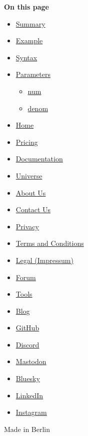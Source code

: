 \textbf{On this page}

\begin{itemize}
\tightlist
\item
  \hyperref[summary]{Summary}
\item
  \hyperref[example]{Example}
\item
  \hyperref[syntax]{Syntax}
\item
  \hyperref[parameters]{Parameters}

  \begin{itemize}
  \tightlist
  \item
    \hyperref[parameters-num]{num}
  \item
    \hyperref[parameters-denom]{denom}
  \end{itemize}
\end{itemize}

\begin{itemize}
\tightlist
\item
  \href{/}{Home}
\item
  \href{/pricing/}{Pricing}
\item
  \href{/docs/}{Documentation}
\item
  \href{/universe/}{Universe}
\item
  \href{/about/}{About Us}
\item
  \href{/contact/}{Contact Us}
\item
  \href{/privacy/}{Privacy}
\item
  \href{https://typst.app/terms}{Terms and Conditions}
\item
  \href{/legal/}{Legal (Impressum)}
\end{itemize}

\begin{itemize}
\tightlist
\item
  \href{https://forum.typst.app}{Forum}
\item
  \href{/tools/}{Tools}
\item
  \href{/blog/}{Blog}
\item
  \href{https://github.com/typst/}{GitHub}
\item
  \href{https://discord.gg/2uDybryKPe}{Discord}
\item
  \href{https://mastodon.social/@typst}{Mastodon}
\item
  \href{https://bsky.app/profile/typst.app}{Bluesky}
\item
  \href{https://www.linkedin.com/company/typst/}{LinkedIn}
\item
  \href{https://instagram.com/typstapp/}{Instagram}
\end{itemize}

Made in Berlin
